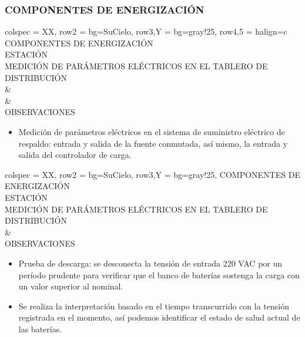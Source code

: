 \subsubsection{COMPONENTES DE ENERGIZACIÓN}
\begin{tblr}{
        colspec = {XX},
        row{2} = {bg=SuCielo},
        row{3,Y} = {bg=gray!25},
        row{4,5} = {halign=c}
    }
     COMPONENTES DE ENERGIZACIÓN \\
     ESTACIÓN \MakeUppercase{} \\
     MEDICIÓN DE PARÁMETROS ELÉCTRICOS EN EL TABLERO DE DISTRIBUCIÓN \\
     &
     \\
     &
     \\
     OBSERVACIONES \\
     \begin{itemize}
        \item Medición de parámetros eléctricos en el sistema de suministro eléctrico de respaldo: entrada y salida de la fuente conmutada, así mismo, la entrada y salida del controlador de carga.
    \end{itemize}
\end{tblr}
\newpage
\begin{tblr}{
        colspec = {XX},
        row{2} = {bg=SuCielo},
        row{3,Y} = {bg=gray!25},
    }
     COMPONENTES DE ENERGIZACIÓN \\
     ESTACIÓN \MakeUppercase{} \\
     MEDICIÓN DE PARÁMETROS ELÉCTRICOS EN EL TABLERO DE DISTRIBUCIÓN \\
     &
     \\
     OBSERVACIONES \\
     \begin{itemize}
        \item Prueba de descarga: se desconecta la tensión de entrada 220 VAC por un período prudente para verificar que el banco de baterías sostenga la carga con un valor superior al nominal.
        \item Se realiza la interpretación basado en el tiempo transcurrido con la tensión registrada en el momento, así podemos identificar el estado de salud actual de las baterías.
    \end{itemize}
\end{tblr}
